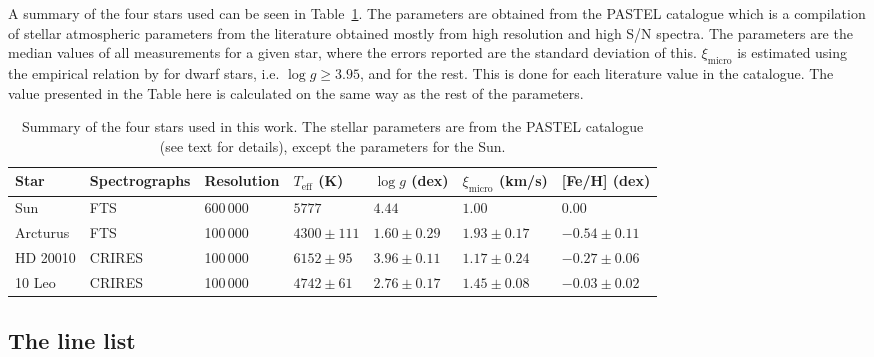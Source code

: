 \documentclass{aa}
\begin{document}
A summary of the four stars used can be seen in Table~\ref{tab:stars}. The
parameters are obtained from the PASTEL catalogue \citep{Soubiran2016} which is
a compilation of stellar atmospheric parameters from the literature obtained
mostly from high resolution and high S/N spectra. The parameters are the median
values of all measurements for a given star, where the errors reported are the
standard deviation of this. $\xi_\mathrm{micro}$ is estimated using the
empirical relation by \citet{Tsantaki2013} for dwarf stars, i.e. $\log
g\ge3.95$, and \citet{Adibekyan2015} for the rest. This is done for each
literature value in the catalogue. The value presented in the Table here is
calculated on the same way as the rest of the parameters.
\begin{table}[htb!]
    \caption{Summary of the four stars used in this work. The stellar parameters
             are from the PASTEL catalogue \citep{Soubiran2016} (see text for
             details), except the parameters for the Sun.}
    \label{tab:stars}
    \centering
    \begin{tabular}{lllllll}
      \hline\hline
        Star        & Spectrographs  & Resolution  & $T_\mathrm{eff}$ (K) &  $\log g$ (dex)  &   $\xi_\mathrm{micro}$ (km/s)   & [Fe/H] (dex)      \\
      \hline
        Sun         & FTS            & 600\,000    & $5777$               &  $4.44$          &    $1.00$                       & $ 0.00$          \\
        Arcturus    & FTS            & 100\,000    & $4300 \pm 111$       &  $1.60 \pm 0.29$ &    $1.93 \pm 0.17$              & $-0.54 \pm 0.11$ \\
        HD 20010    & CRIRES         & 100\,000    & $6152 \pm  95$       &  $3.96 \pm 0.11$ &    $1.17 \pm 0.24$              & $-0.27 \pm 0.06$ \\
        10 Leo      & CRIRES         & 100\,000    & $4742 \pm  61$       &  $2.76 \pm 0.17$ &    $1.45 \pm 0.08$              & $-0.03 \pm 0.02$ \\
      \hline
    \end{tabular}
\end{table}

\subsection{The line list}
\end{document}
